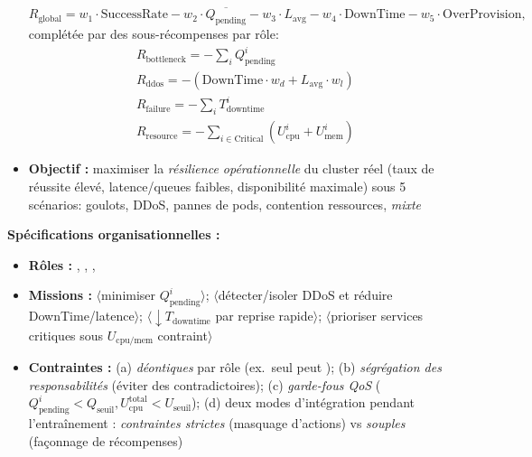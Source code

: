 \begin{itemize}
        \[
          R_{\text{global}}=
          w_1\cdot\text{SuccessRate}
          -w_2\cdot\overline{Q_{\text{pending}}}
          -w_3\cdot L_{\text{avg}}
          -w_4\cdot \text{DownTime}
          -w_5\cdot \text{OverProvision},
        \]
        complétée par des sous-récompenses par rôle:
        \begin{gather*}
          R_{\text{bottleneck}}=-\sum_i Q_{\text{pending}}^i                  \\
          R_{\text{ddos}}=-(\text{DownTime}\cdot w_d+L_{\text{avg}}\cdot w_l) \\
          R_{\text{failure}}=-\sum_i T_{\text{downtime}}^i                    \\
          R_{\text{resource}}=-\sum_{i\in\text{Critical}}(U_{\text{cpu}}^i+U_{\text{mem}}^i)
        \end{gather*}

  \item \textbf{Objectif :} maximiser la \emph{résilience opérationnelle} du cluster réel (taux de réussite élevé, latence/queues faibles, disponibilité maximale) sous 5 scénarios: goulots, DDoS, pannes de pods, contention ressources, \emph{mixte}
\end{itemize}

\noindent\textbf{Spécifications organisationnelles :}
\begin{itemize}
  \item \textbf{Rôles :} , , , 
  \item \textbf{Missions :}
        \(\langle\)minimiser \(Q_{\text{pending}}^i\)\(\rangle\);
        \(\langle\)détecter/isoler DDoS et réduire DownTime/latence\(\rangle\);
        \(\langle\)\(\downarrow T_{\text{downtime}}\) par reprise rapide\(\rangle\);
        \(\langle\)prioriser services critiques sous \(U_{\text{cpu/mem}}\) contraint\(\rangle\)
  \item \textbf{Contraintes :}
        (a) \emph{déontiques} par rôle (ex.~seul  peut );
        (b) \emph{ségrégation des responsabilités} (éviter des  contradictoires);
        (c) \emph{garde-fous QoS} (\(Q_{\text{pending}}^i<Q_{\text{seuil}}, U_{\text{cpu}}^{\text{total}}<U_{\text{seuil}}\));
        (d) deux modes d'intégration pendant l'entraînement : \textit{contraintes strictes} (masquage d'actions) vs \textit{souples} (façonnage de récompenses)
\end{itemize}

